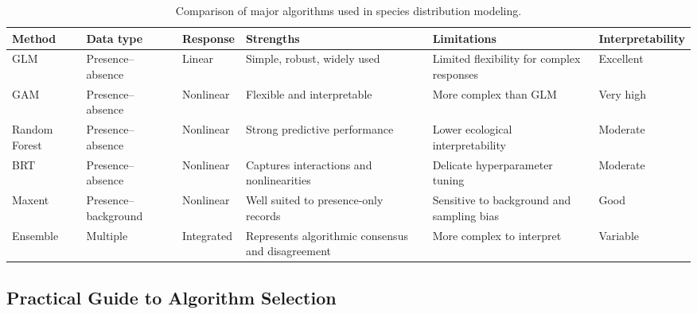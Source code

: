 \begin{table}[H]
\centering
\caption{Comparison of major algorithms used in species distribution modeling.}
\label{tab:comparacao_algoritmos_sdm}
\scriptsize
\setlength{\tabcolsep}{2.5pt}
\begin{tabular}{p{}p{}p{}p{}p{}p{}}
\toprule
\textbf{Method} & \textbf{Data type} & \textbf{Response} & \textbf{Strengths} & \textbf{Limitations} & \textbf{Interpretability} \\
\midrule
GLM & Presence--absence & Linear & Simple, robust, widely used & Limited flexibility for complex responses & Excellent \\
GAM & Presence--absence & Nonlinear & Flexible and interpretable & More complex than GLM & Very high \\
Random Forest & Presence--absence & Nonlinear & Strong predictive performance & Lower ecological interpretability & Moderate \\
BRT & Presence--absence & Nonlinear & Captures interactions and nonlinearities & Delicate hyperparameter tuning & Moderate \\
Maxent & Presence--background & Nonlinear & Well suited to presence-only records & Sensitive to background and sampling bias & Good \\
Ensemble & Multiple & Integrated & Represents algorithmic consensus and disagreement & More complex to interpret & Variable \\
\bottomrule
\end{tabular}
\end{table}

\subsection*{Practical Guide to Algorithm Selection}

